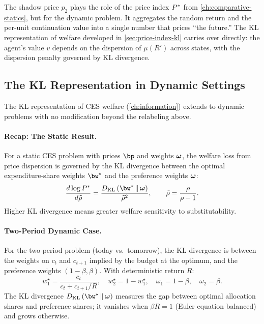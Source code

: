 \begin{calloutnote}
The shadow price $p_2$ plays the role of the price index $P^{*}$ from \cref{ch:comparative-statics}, but for the dynamic problem. It aggregates the random return and the per-unit continuation value into a single number that prices ``the future.'' The KL representation of welfare developed in \cref{sec:price-index-kl} carries over directly: the agent's value $v$ depends on the dispersion of $\mu(R')$ across states, with the dispersion penalty governed by KL divergence.
\end{calloutnote}

\subsection{The KL Representation in Dynamic Settings}
\label{subsec:dp-kl-representation}

The KL representation of CES welfare (\cref{ch:information}) extends to dynamic problems with no modification beyond the relabeling above.

\paragraph{Recap: The Static Result.}
For a static CES problem with prices $\bp$ and weights $\boldsymbol{\omega}$, the welfare loss from price dispersion is governed by the KL divergence between the optimal expenditure-share weights $\bw^\star$ and the preference weights $\boldsymbol{\omega}$:
\begin{equation}
\frac{d \log \Pstar}{d \tilde{\rho}} = \frac{\KL{\bw^\star}{\bom}}{\tilde{\rho}^2}, \qquad \tilde{\rho} = \frac{\rho}{\rho - 1}.
\label{eq:kl-static}
\end{equation}
Higher KL divergence means greater welfare sensitivity to substitutability.

\paragraph{Two-Period Dynamic Case.}
For the two-period problem (today vs.\ tomorrow), the KL divergence is between the weights on $c_t$ and $c_{t+1}$ implied by the budget at the optimum, and the preference weights $(1-\beta, \beta)$. With deterministic return $R$:
\begin{equation}
w_1^\star = \frac{c_t}{c_t + c_{t+1}/R}, \quad w_2^\star = 1 - w_1^\star, \quad \omega_1 = 1-\beta, \quad \omega_2 = \beta.
\label{eq:dynamic-kl-weights}
\end{equation}
The KL divergence $\KL{\bw^\star}{\bom}$ measures the gap between optimal allocation shares and preference shares; it vanishes when $\beta R = 1$ (Euler equation balanced) and grows otherwise.

